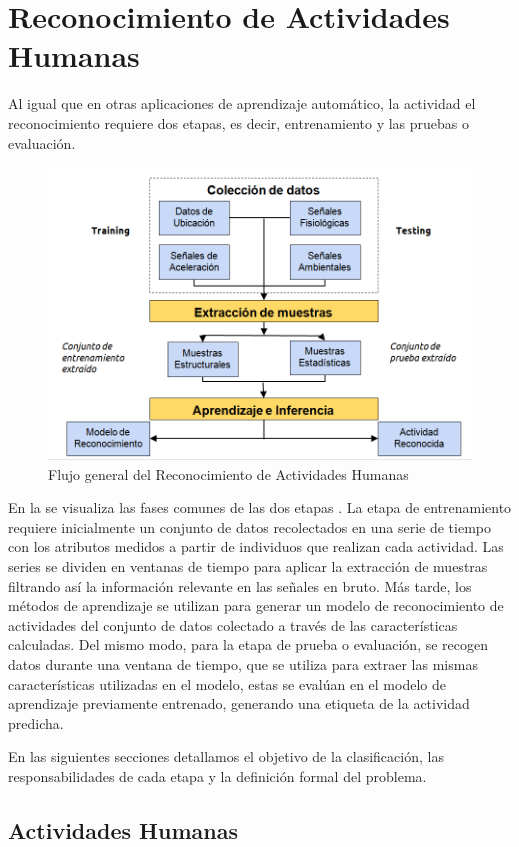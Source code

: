 \section{Reconocimiento de Actividades Humanas}

\label{sec25:metodologia-har} Al igual que en otras aplicaciones
de aprendizaje automático, la actividad el reconocimiento requiere
dos etapas, es decir, entrenamiento y las pruebas o evaluación.

\begin{figure}[!htbp]
\centering \includegraphics[width=0.7\linewidth]{capitulo-2/graphics/harsystem}
\caption[Flujo HAR]{Flujo general del Reconocimiento de Actividades Humanas}
\label{fig:harsystem} 
\end{figure}

En la  se visualiza las fases comunes de las
dos etapas \cite{LaraLabrador2013}. La etapa de entrenamiento requiere
inicialmente un conjunto de datos recolectados en una serie de tiempo
con los atributos medidos a partir de individuos que realizan cada
actividad. Las series se dividen en ventanas de tiempo para aplicar
la extracción de muestras filtrando así la información relevante en
las señales en bruto. Más tarde, los métodos de aprendizaje se utilizan
para generar un modelo de reconocimiento de actividades del conjunto
de datos colectado a través de las características calculadas. Del
mismo modo, para la etapa de prueba o evaluación, se recogen datos
durante una ventana de tiempo, que se utiliza para extraer las mismas
características utilizadas en el modelo, estas se evalúan en el modelo
de aprendizaje previamente entrenado, generando una etiqueta de la
actividad predicha.

En las siguientes secciones detallamos el objetivo de la clasificación,
las responsabilidades de cada etapa y la definición formal del problema.

\subsection{Actividades Humanas}


